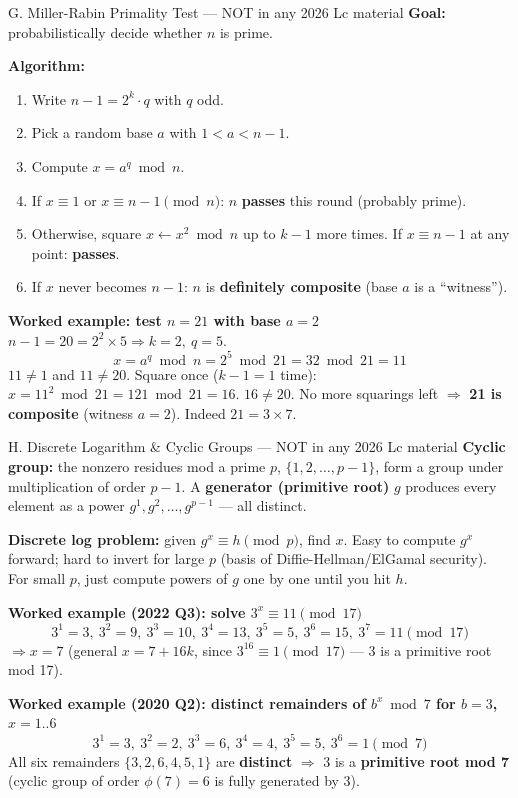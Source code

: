 \documentclass[12pt,a4paper]{article}
\begin{document}
\begin{algobox}{G. Miller-Rabin Primality Test --- NOT in any 2026 Lc material}
\textbf{Goal:} probabilistically decide whether $n$ is prime.

\textbf{Algorithm:}
\begin{enumerate}[noitemsep]
  \item Write $n-1 = 2^k \cdot q$ with $q$ odd.
  \item Pick a random base $a$ with $1<a<n-1$.
  \item Compute $x = a^q \bmod n$.
  \item If $x \equiv 1$ or $x \equiv n-1 \pmod n$: $n$ \textbf{passes} this round (probably prime).
  \item Otherwise, square $x \leftarrow x^2 \bmod n$ up to $k-1$ more times. If $x \equiv n-1$ at any point: \textbf{passes}.
  \item If $x$ never becomes $n-1$: $n$ is \textbf{definitely composite} (base $a$ is a ``witness'').
\end{enumerate}

\textbf{Worked example: test $n=21$ with base $a=2$}
$n-1=20=2^2 \times 5 \Rightarrow k=2,\ q=5$.
\[
x=a^q\bmod n = 2^5\bmod21 = 32\bmod21 = 11
\]
$11\neq1$ and $11\neq20$. Square once ($k-1=1$ time): $x=11^2\bmod21=121\bmod21=16$.
$16\neq20$. No more squarings left $\Rightarrow$ \textbf{21 is composite} (witness $a=2$). Indeed $21=3\times7$. \checkmark
\end{algobox}

\begin{algobox}{H. Discrete Logarithm \& Cyclic Groups --- NOT in any 2026 Lc material}
\textbf{Cyclic group:} the nonzero residues mod a prime $p$, $\{1,2,\dots,p-1\}$, form a group under multiplication of order $p-1$. A \textbf{generator (primitive root)} $g$ produces every element as a power $g^1,g^2,\dots,g^{p-1}$ --- all distinct.

\textbf{Discrete log problem:} given $g^x \equiv h \pmod p$, find $x$. Easy to compute $g^x$ forward; hard to invert for large $p$ (basis of Diffie-Hellman/ElGamal security). For small $p$, just compute powers of $g$ one by one until you hit $h$.

\textbf{Worked example (2022 Q3): solve $3^x \equiv 11 \pmod{17}$}
\[
3^1=3,\ 3^2=9,\ 3^3=10,\ 3^4=13,\ 3^5=5,\ 3^6=15,\ 3^7=\boxed{11}\pmod{17}
\]
$\Rightarrow x=7$ (general $x=7+16k$, since $3^{16}\equiv1\pmod{17}$ --- 3 is a primitive root mod 17).

\textbf{Worked example (2020 Q2): distinct remainders of $b^x \bmod 7$ for $b=3$, $x=1..6$}
\[
3^1=3,\ 3^2=2,\ 3^3=6,\ 3^4=4,\ 3^5=5,\ 3^6=1 \pmod7
\]
All six remainders $\{3,2,6,4,5,1\}$ are \textbf{distinct} $\Rightarrow$ 3 is a \textbf{primitive root mod 7} (cyclic group of order $\phi(7)=6$ is fully generated by 3).
\end{algobox}
\end{document}
